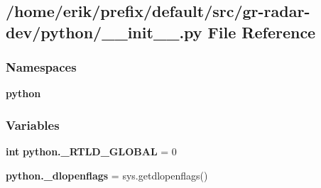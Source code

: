 \subsection{/home/erik/prefix/default/src/gr-\/radar-\/dev/python/\+\_\+\+\_\+init\+\_\+\+\_\+.py File Reference}
\label{python_2____init_____8py}
\subsubsection*{Namespaces}
\begin{DoxyCompactItemize}
\item 
 {\bf python}
\end{DoxyCompactItemize}
\subsubsection*{Variables}
\begin{DoxyCompactItemize}
\item 
{\bf int} {\bf python.\+\_\+\+R\+T\+L\+D\+\_\+\+G\+L\+O\+B\+AL} = 0
\item 
{\bf python.\+\_\+dlopenflags} = sys.\+getdlopenflags()
\end{DoxyCompactItemize}
